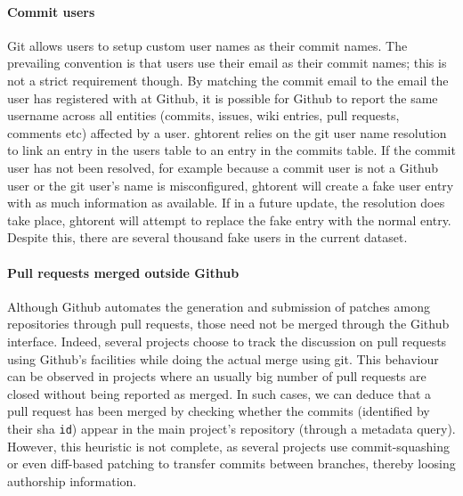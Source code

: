 \documentclass[conference,letter]{IEEEtran}
\begin{document}
\paragraph*{Commit users} Git allows users to setup custom user names as
    their commit names. The prevailing convention is that users use their email
    as their commit names; this is not a strict requirement though. By matching
    the commit email to the email the user has registered with at Github, it is
    possible for Github to report the same username across all entities
    (commits, issues, wiki entries, pull requests, comments etc) affected by a
    user. {\sc ght}orent relies on the git user name resolution to link an entry in
    the \textsf{users} table to an entry in the \textsf{commits} table. If the
    commit user has not been resolved, for example because a commit user is not
    a Github user or the git user's name is misconfigured, {\sc ght}orent will create
    a fake user entry with as much information as available. If in a future
    update, the resolution does take place, {\sc ght}orent will attempt to replace
    the fake entry with the normal entry. Despite this, there are several
    thousand fake users in the current dataset.
    
\paragraph*{Pull requests merged outside Github} Although Github
    automates the generation and submission of patches among repositories
    through pull requests, those need not be merged through the Github
    interface. Indeed, several projects choose to track the discussion on pull
    requests using Github's facilities while doing the actual merge using
    {\sf git}. This behaviour can be observed in projects where an usually big
    number of pull requests are closed without being reported as merged.
    In such cases, we can deduce that a pull request has been merged by checking
    whether the commits (identified by their {\sc sha} \texttt{id}) appear in 
    the main project's repository (through a metadata query). However, this
    heuristic is not complete, as several projects use commit-squashing or
    even diff-based patching to transfer commits between branches, thereby
    loosing authorship information.

\end{document}
